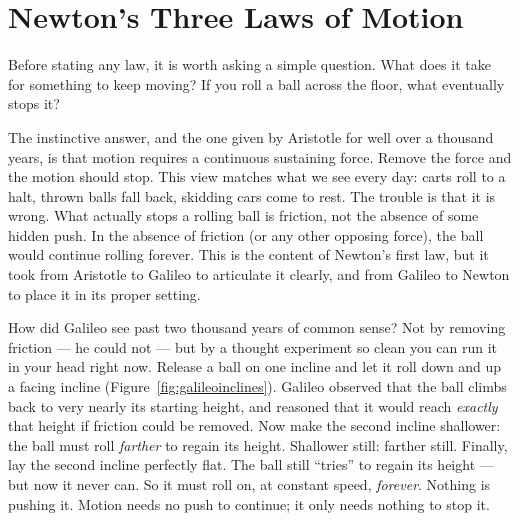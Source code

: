 \chapter{Newton's Three Laws of Motion}

Before stating any law, it is worth asking a simple question. What does it take for something
to keep moving? If you roll a ball across the floor, what eventually stops it?

The instinctive answer, and the one given by Aristotle for well over a thousand years, is
that motion requires a continuous sustaining force. Remove the force and the motion should
stop. This view matches what we see every day: carts roll to a halt, thrown balls fall back,
skidding cars come to rest. The trouble is that it is wrong. What actually stops a rolling
ball is friction, not the absence of some hidden push. In the absence of friction (or any
other opposing force), the ball would continue rolling forever. This is the content of
Newton's first law, but it took from Aristotle to Galileo to articulate it clearly, and from
Galileo to Newton to place it in its proper setting.

How did Galileo see past two thousand years of common sense? Not by removing
friction --- he could not --- but by a thought experiment so clean you can run
it in your head right now. Release a ball on one incline and let it roll down
and up a facing incline (Figure~\ref{fig:galileoinclines}). Galileo observed
that the ball climbs back to very nearly its starting height, and reasoned
that it would reach \emph{exactly} that height if friction could be removed.
Now make the second incline shallower: the ball must roll \emph{farther} to
regain its height. Shallower still: farther still. Finally, lay the second
incline perfectly flat. The ball still ``tries'' to regain its height --- but
now it never can. So it must roll on, at constant speed, \emph{forever}.
Nothing is pushing it. Motion needs no push to continue; it only needs
nothing to stop it.

